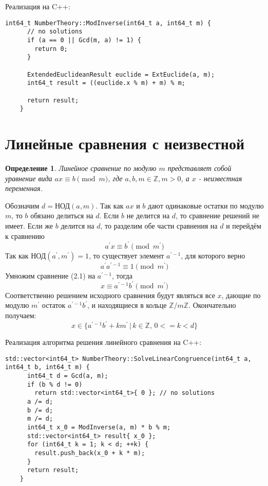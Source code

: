\documentclass[12pt, a4paper, openany]{book}
\newtheorem*{definition}{Определение}
\begin{document}
\noindent
Реализация на C++:

\begin{lstlisting}[breaklines=true]
    int64_t NumberTheory::ModInverse(int64_t a, int64_t m) {
      // no solutions 
      if (a == 0 || Gcd(m, a) != 1) {
        return 0;
      }
    
      ExtendedEuclideanResult euclide = ExtEuclide(a, m);
      int64_t result = ((euclide.x % m) + m) % m;
    
      return result;
    }
\end{lstlisting}

\section{Линейные сравнения с неизвестной}

\begin{definition}
    Линейное сравнение по модулю $m$ представляет собой уравнение вида $ax \equiv b \pmod{m}$, где $a, b, m \in \mathbb{Z}, m > 0$, а $x$ - неизвестная переменная.
\end{definition}

    Обозначим $d = \text{НОД}(a, m)$. Так как $ax$ и $b$ дают одинаковые остатки по модулю $m$, то $b$ обязано делиться на $d$. Если $b$ не делится на $d$, то сравнение решений не имеет.
    Если же $b$ делится на $d$, то разделим обе части сравнения на $d$ и перейдём к сравнению 
    \begin{equation}a^{'}x \equiv b^{'} \pmod{m^{'}}\end{equation}
    Так как $\text{НОД}(a^{'}, m^{'}) = 1$, то существует элемент $a^{'-1}$, для которого верно
    \begin{equation}a^{'}a^{'-1} \equiv 1 \pmod{m^{'}}\end{equation}
    Умножим сравнение (2.1) на $a^{'-1}$, тогда
    \begin{equation}x \equiv a^{'-1}b^{'} \pmod{m^{'}}\end{equation}
    Соответственно решением исходного сравнения будут являться все $x$, дающие по модулю $m^{'}$ остаток $a^{'-1}b^{'}$, и находящиеся в кольце $\mathbb{Z}/m\mathbb{Z}$.
    Окончательно получаем:
\begin{equation}
    x \in \{a^{'-1}b^{'} + km^{'}\, |\, k \in \mathbb{Z},\, 0 <= k < d\}
\end{equation}

\noindent
    Реализация алгоритма решения линейного сравнения на C++:

\begin{lstlisting}[breaklines=true]
    std::vector<int64_t> NumberTheory::SolveLinearCongruence(int64_t a, int64_t b, int64_t m) {
      int64_t d = Gcd(a, m);
      if (b % d != 0)
        return std::vector<int64_t>{ 0 }; // no solutions
      a /= d;
      b /= d;
      m /= d;
      int64_t x_0 = ModInverse(a, m) * b % m;
      std::vector<int64_t> result{ x_0 };
      for (int64_t k = 1; k < d; ++k) {
        result.push_back(x_0 + k * m);
      }
      return result;
    }
\end{lstlisting}
\end{document}
